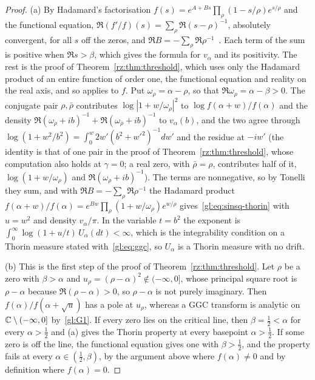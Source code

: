 \begin{proof}
(a) By Hadamard's factorisation $f(s)=e^{A+Bs}\prod_\rho(1-s/\rho)e^{s/\rho}$ and the functional equation, $\Re(f'/f)(s)=\sum_\rho\Re(s-\rho)^{-1}$, absolutely convergent, for all $s$ off the zeros, and $\Re B=-\sum_\rho\Re\rho^{-1}$~\cite[Ch.~12]{Davenport}. Each term of the sum is positive when $\Re s>\beta$, which gives the formula for $v_\alpha$ and its positivity. The rest is the proof of Theorem~\ref{rz:thm:threshold}, which uses only the Hadamard product of an entire function of order one, the functional equation and reality on the real axis, and so applies to $f$. Put $\omega_\rho=\alpha-\rho$, so that $\Re\omega_\rho=\alpha-\beta>0$. The conjugate pair $\rho,\bar\rho$ contributes $\log|1+w/\omega_\rho|^2$ to $\log f(\alpha+w)/f(\alpha)$ and the density $\Re(\omega_\rho+ib)^{-1}+\Re(\omega_{\bar\rho}+ib)^{-1}$ to $v_\alpha(b)$, and the two agree through $\log(1+w^2/b^2)=\int_0^w2w'(b^2+w'^2)^{-1}dw'$ and the residue at $-iw'$ (the identity is that of one pair in the proof of Theorem~\ref{rz:thm:threshold}, whose computation also holds at $\gamma=0$; a real zero, with $\bar\rho=\rho$, contributes half of it, $\log(1+w/\omega_\rho)$ and $\Re(\omega_\rho+ib)^{-1}$). The terms are nonnegative, so by Tonelli they sum, and with $\Re B=-\sum_\rho\Re\rho^{-1}$ the Hadamard product $f(\alpha+w)/f(\alpha)=e^{Bw}\prod_\rho(1+w/\omega_\rho)e^{w/\rho}$ gives~\eqref{gl:eq:sinsq-thorin} with $u=w^2$ and density $v_\alpha/\pi$. In the variable $t=b^2$ the exponent is $\int_0^\infty\log(1+u/t)\,U_\alpha(dt)<\infty$, which is the integrability condition on a Thorin measure stated with~\eqref{gl:eq:ggc}, so $U_\alpha$ is a Thorin measure with no drift.

(b) This is the first step of the proof of Theorem~\ref{rz:thm:threshold}. Let $\rho$ be a zero with $\beta>\alpha$ and $u_\rho=(\rho-\alpha)^2\notin(-\infty,0]$, whose principal square root is $\rho-\alpha$ because $\Re(\rho-\alpha)>0$, so $\rho-\alpha$ is not purely imaginary. Then $f(\alpha)/f(\alpha+\sqrt u)$ has a pole at $u_\rho$, whereas a GGC transform is analytic on $\mathbb{C}\setminus(-\infty,0]$ by~\ref{gl:G1}. If every zero lies on the critical line, then $\beta=\tfrac12<\alpha$ for every $\alpha>\tfrac12$ and (a) gives the Thorin property at every basepoint $\alpha>\tfrac12$. If some zero is off the line, the functional equation gives one with $\beta>\tfrac12$, and the property fails at every $\alpha\in(\tfrac12,\beta)$, by the argument above where $f(\alpha)\neq0$ and by definition where $f(\alpha)=0$.


\end{proof}
